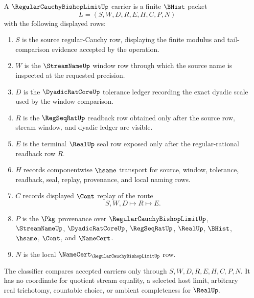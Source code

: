 \begin{definition}
\label{def:regular-cauchy-bishop-limit-carrier}
A $\RegularCauchyBishopLimitUp$ carrier is a finite $\BHist$ packet
$$
L=(S,W,D,R,E,H,C,P,N)
$$
with the following displayed rows:
\begin{enumerate}
\item $S$ is the source regular-Cauchy row, displaying the finite modulus and tail-comparison evidence accepted by the operation.
\item $W$ is the $\StreamNameUp$ window row through which the source name is inspected at the requested precision.
\item $D$ is the $\DyadicRatCoreUp$ tolerance ledger recording the exact dyadic scale used by the window comparison.
\item $R$ is the $\RegSeqRatUp$ readback row obtained only after the source row, stream window, and dyadic ledger are visible.
\item $E$ is the terminal $\RealUp$ seal row exposed only after the regular-rational readback row $R$.
\item $H$ records componentwise $\hsame$ transport for source, window, tolerance, readback, seal, replay, provenance, and local naming rows.
\item $C$ records displayed $\Cont$ replay of the route
$$
S,W,D \longmapsto R \longmapsto E .
$$
\item $P$ is the $\Pkg$ provenance over $\RegularCauchyBishopLimitUp$, $\StreamNameUp$, $\DyadicRatCoreUp$, $\RegSeqRatUp$, $\RealUp$, $\BHist$, $\hsame$, $\Cont$, and $\NameCert$.
\item $N$ is the local $\NameCert_{\RegularCauchyBishopLimitUp}$ row.
\end{enumerate}
The classifier compares accepted carriers only through $S,W,D,R,E,H,C,P,N$. It has no coordinate for quotient stream equality, a selected host limit, arbitrary real trichotomy, countable choice, or ambient completeness for $\RealUp$.
\end{definition}

